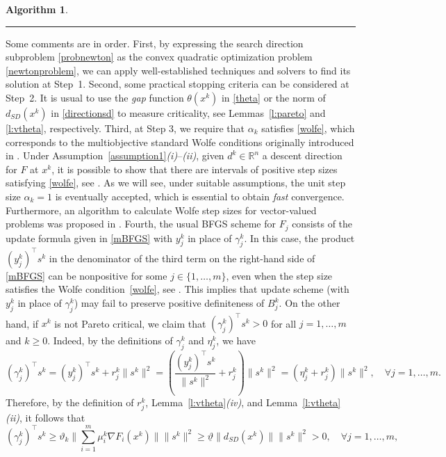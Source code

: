 \documentclass[11pt]{article}
\newtheorem{algorithm}{Algorithm}
\numberwithin{assumption}{section}
\newcommand{\R}{\mathbb{R}}
\newcommand{\dsd}{d_{SD}}
\begin{document}
\begin{algorithm}
\begin{description}
	\end{description}
\vspace{-10pt}\noindent\rule{\textwidth}{1pt}
\end{algorithm}

Some comments are in order. 
First, by expressing the search direction subproblem \eqref{probnewton} as the convex quadratic optimization problem \eqref{newtonproblem}, we can apply well-established techniques and solvers to find its solution at Step~1.
 Second, some practical stopping criteria can be considered at Step~2. It is usual to use the {\it gap} function $\theta(x^k)$ in \eqref{theta} or the norm of $\dsd(x^k)$ in \eqref{directionsd} to measure criticality, see Lemmas~\ref{l:pareto} and \ref{l:vtheta}, respectively.
 Third, at Step 3, we require that $\alpha_k$ satisfies \eqref{wolfe}, which corresponds to the multiobjective standard Wolfe conditions originally introduced in \cite{cgvo}.
 Under Assumption~\ref{assumption1}{\it(i)}--{\it(ii)}, given $d^k\in\R^n$ a descent direction for $F$ at $x^k$, it is possible to show that there are intervals of positive step sizes satisfying \eqref{wolfe}, see \cite[Proposition~3.2]{cgvo}.
As we will see, under suitable assumptions, the unit step size $\alpha_k=1$  is eventually accepted, which is essential to obtain {\it fast} convergence.
Furthermore, an algorithm to calculate Wolfe step sizes for vector-valued problems was proposed in \cite{PerezPrudente2019}.
Fourth, the usual BFGS scheme for $F_j$ consists of the update formula given in \eqref{mBFGS} with $y_j^k$ in place of $\gamma_j^k$.
In this case, the product $(y_j^k)^\top s^k$ in the denominator of the third term on the right-hand side of \eqref{mBFGS} can be nonpositive for some $j\in\{1,\ldots,m\}$, even when the step size satisfies the Wolfe condition~\eqref{wolfe}, see \cite[Example~3.3]{Leandro&Danilo}.
This implies that update scheme (with $y_j^k$ in place of $\gamma_j^k$) may fail to preserve positive definiteness of $B_j^k$.
On the other hand, if $x^k$ is not Pareto critical, we claim that $(\gamma_j^{k})^\top s^k>0$ for all $j=1,\ldots,m$ and $k\geq 0$. Indeed, by the definitions of $\gamma_j^{k}$ and $\eta_j^k$, we have
$$(\gamma_j^{k})^\top s^k =(y_j^k)^\top s^k + r_j^k \|s^k\|^2 = \left(\dfrac{(y_j^k)^\top s^k}{\|s^k\|^2} + r_j^k\right) \|s^k\|^2=(\eta_j^k+ r_j^k)  \|s^k\|^2, \quad \forall j=1,\ldots,m.$$
Therefore, by the definition of $r_j^k$, Lemma~\ref{l:vtheta}{\it(iv)}, and Lemma~\ref{l:vtheta}{\it(ii)}, it follows that
\begin{equation}\label{curitiba}
(\gamma_j^{k})^\top s^k\geq \vartheta_k\|\sum_{i=1}^m\mu_i^k \nabla F_i(x^k)\| \|s^k\|^2\geq \underline{\vartheta} \|\dsd(x^k)\| \|s^k\|^2>0, \quad \forall j=1,\ldots,m,
\end{equation}
\end{document}
